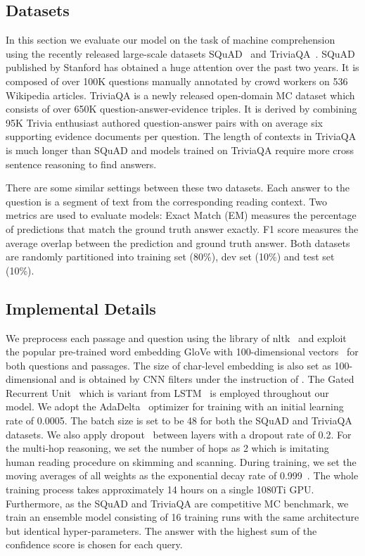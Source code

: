 \documentclass[letterpaper]{article} %
\begin{document}
 \subsection{Datasets}
 In this section we evaluate our model on the task of machine comprehension using the recently released large-scale datasets SQuAD~\cite{rajpurkar2016squad} and TriviaQA~\cite{Joshi2017TriviaQAAL}. SQuAD published by Stanford has obtained a huge attention over the past two years. It is composed of over 100K questions manually annotated by crowd workers on 536 Wikipedia articles. TriviaQA is a newly released open-domain MC dataset which consists of over 650K question-answer-evidence triples. It is derived by combining 95K Trivia enthusiast authored question-answer pairs with on average six supporting evidence documents per question. The length of contexts in TriviaQA is much longer than SQuAD and models trained on TriviaQA require more cross sentence reasoning to find answers. 
 
 There are some similar settings between these two datasets. Each answer to the question is a segment of text from the corresponding reading context. Two metrics are used to evaluate models: Exact Match (EM) measures the percentage of predictions that match the ground truth answer exactly. F1 score measures the average overlap between the prediction and ground truth answer. Both datasets are randomly partitioned into training set (80\%), dev set (10\%) and test set (10\%). 
 
 \subsection{Implemental Details}
 We preprocess each passage and question using the library of nltk~\cite{Loper2002NLTKTN} and exploit the popular pre-trained word embedding GloVe with 100-dimensional vectors~\cite{Pennington2014GloveGV} for both questions and passages. The size of char-level embedding is also set as 100-dimensional and is obtained by CNN filters under the instruction of \cite{Kim2014ConvolutionalNN}. The Gated Recurrent Unit~\cite{Cho2014Learning} which is variant from LSTM~\cite{Hochreiter1997Long} is employed throughout our model. We adopt the AdaDelta~\cite{Zeiler2012ADADELTA} optimizer for training with an initial learning rate of 0.0005. The batch size is set to be 48 for both the SQuAD and TriviaQA datasets. We also apply dropout~\cite{Srivastava2014Dropout} between layers with a dropout rate of 0.2. For the multi-hop reasoning, we set the number of hops as 2 which is imitating human reading procedure on skimming and scanning. During training, we set the moving averages of all weights as the exponential decay rate of 0.999~\cite{Lucas2000ExponentiallyWM}. The whole training process takes approximately 14 hours on a single 1080Ti GPU. Furthermore, as the SQuAD and TriviaQA are competitive MC benchmark, we train an ensemble model consisting of 16 training runs with the same architecture but identical hyper-parameters. The answer with the highest sum of the confidence score is chosen for each query.
 
\end{document}
